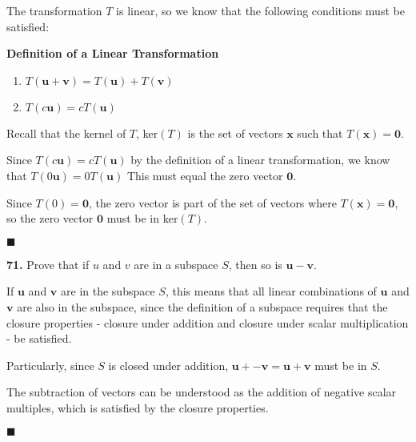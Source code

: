 \documentclass[12pt]{article}
\renewcommand{\vec}[1]{\mathbf{#1}}
\begin{document}
\begin{lin-proof}

The transformation $T$ is linear, so we know that the following conditions must be satisfied:~\\

\begin{elaboration}
\textbf{Definition of a Linear Transformation}
\begin{enumerate}[label=\alph*)]
\item $T(\vec{u} + \vec{v}) = T(\vec{u}) + T(\vec{v})$

\item $T(c\vec{u}) = cT(\vec{u})$
\end{enumerate}

\end{elaboration}

Recall that the kernel of $T$, ker$(T)$ is the set of vectors $\vec{x}$ such that $T(\vec{x}) = \vec{0}$.


Since $T(c\vec{u}) = cT(\vec{u})$ by the definition of a linear transformation, we know that $T(0\vec{u}) = 0T(\vec{u})$ This must equal the zero vector $\vec{0}$.

Since $T(0) = \vec{0}$, the zero vector is part of the set of vectors where $T(\vec{x}) = \vec{0}$, so the zero vector $\vec{0}$ must be in ker$(T)$.

 \begin{flushright}$\blacksquare$ \end{flushright}
\end{lin-proof}

\textbf{71.} Prove that if $u$ and $v$ are in a subspace $S$, then so is $\vec{u - v}$.

\begin{lin-proof}
If $\vec{u}$ and $\vec{v}$ are in the subspace $S$, this means that all linear combinations of $\vec{u}$ and $\vec{v}$ are also in the subspace, since the definition of a subspace requires that the closure properties - closure under addition and closure under scalar multiplication - be satisfied.

Particularly, since $S$ is closed under addition, $\vec{u} + \vec{-v} = \vec{u + v}$ must be in $S$.

The subtraction of vectors can be understood as the addition of negative scalar multiples, which is satisfied by the closure properties.
 \begin{flushright}$\blacksquare$ \end{flushright}
\end{lin-proof}
\end{document}
